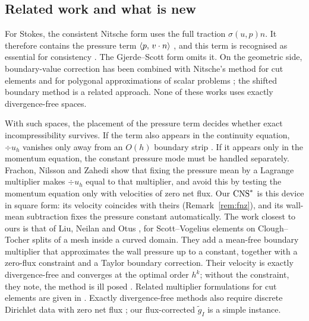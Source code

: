 \subsection*{Related work and what is new}
For Stokes, the consistent Nitsche form uses the full traction $\sigma(u,p)n$. It therefore contains the pressure term $\langle p,\, v\cdot n\rangle$ \cite{FreundStenberg1995,Stenberg1995,Becker2002,BurmanHansbo2014}, and this term is recognised as essential for consistency \cite{BurmanHansboLarson2019Stokes}. The Gjerde--Scott form omits it. On the geometric side, boundary-value correction \cite{BrambleDupontThomee1972} has been combined with Nitsche's method for cut elements \cite{BurmanHansboLarson2018,BurmanHansboLarson2019Stokes} and for polygonal approximations of scalar problems \cite{DupontGuzmanScott2025}; the shifted boundary method \cite{MainScovazzi2018} is a related approach. None of these works uses exactly divergence-free spaces.

With such spaces, the placement of the pressure term decides whether exact incompressibility survives. If the term also appears in the continuity equation, $\div u_h$ vanishes only away from an $O(h)$ boundary strip \cite{LiuNeilanOlshanskii2023}. If it appears only in the momentum equation, the constant pressure mode must be handled separately. Frachon, Nilsson and Zahedi \cite{FrachonNilssonZahedi2024} show that fixing the pressure mean by a Lagrange multiplier makes $\div u_h$ equal to that multiplier, and avoid this by testing the momentum equation only with velocities of zero net flux. Our $\mathrm{CNS}^\ast$ is this device in square form: its velocity coincides with theirs (Remark~\ref{rem:fnz}), and its wall-mean subtraction fixes the pressure constant automatically. The work closest to ours is that of Liu, Neilan and Otus \cite{LiuNeilanOtus2023}, for Scott--Vogelius elements on Clough--Tocher splits of a mesh inside a curved domain. They add a mean-free boundary multiplier that approximates the wall pressure up to a constant, together with a zero-flux constraint and a Taylor boundary correction. Their velocity is exactly divergence-free and converges at the optimal order $h^k$; without the constraint, they note, the method is ill posed \cite[Remark~3.2]{LiuNeilanOtus2023}. Related multiplier formulations for cut elements are given in \cite{BurmanHansboLarson2024}. Exactly divergence-free methods also require discrete Dirichlet data with zero net flux \cite{EickmannScottTscherpel2025}; our flux-corrected $\tilde g_I$ is a simple instance.

